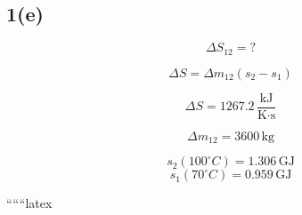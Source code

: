\subsection*{1(e)}
\begin{equation*}
\Delta S_{12} = ?
\end{equation*}

\begin{equation*}
\Delta S = \Delta m_{12} (s_2 - s_1)
\end{equation*}

\begin{equation*}
\Delta S = 1267.2 \, \frac{\text{kJ}}{\text{K} \cdot \text{s}}
\end{equation*}

\begin{equation*}
\Delta m_{12} = 3600 \, \text{kg}
\end{equation*}

\begin{equation*}
s_2 (100^\circ C) = 1.306 \, \text{GJ}
\end{equation*}
\begin{equation*}
s_1 (70^\circ C) = 0.959 \, \text{GJ}
\end{equation*}

``````latex